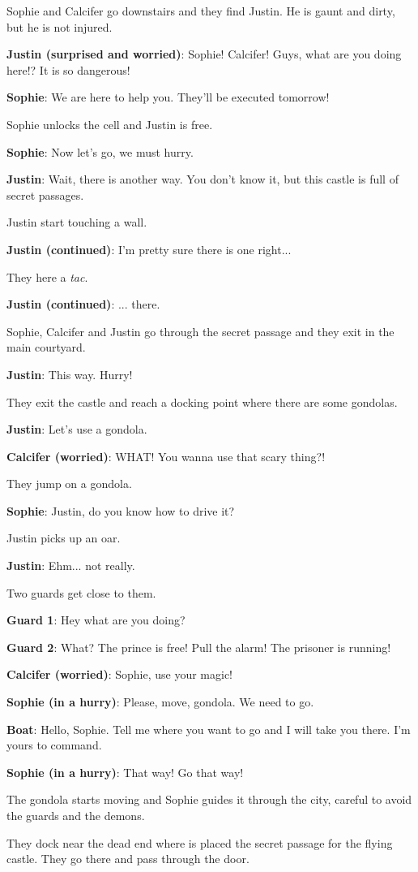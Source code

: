 
Sophie and Calcifer go downstairs and they find Justin. He is gaunt and dirty, but he is not injured.

\textbf{Justin (surprised and worried)}: Sophie! Calcifer! Guys, what are you doing here!? It is so dangerous!

\textbf{Sophie}: We are here to help you. They'll be executed tomorrow!

Sophie unlocks the cell and Justin is free.

\textbf{Sophie}: Now let's go, we must hurry.

\textbf{Justin}: Wait, there is another way. You don't know it, but this castle is full of secret passages.

Justin start touching a wall.

\textbf{Justin (continued)}: I'm pretty sure there is one right...

They here a \textit{tac}.

\textbf{Justin (continued)}: ... there.

Sophie, Calcifer and Justin go through the secret passage and they exit in the main courtyard.

\textbf{Justin}: This way. Hurry! 

They exit the castle and reach a docking point where there are some gondolas.

\textbf{Justin}: Let's use a gondola.

\textbf{Calcifer (worried)}: WHAT! You wanna use that scary thing?!

They jump on a gondola.

\textbf{Sophie}: Justin, do you know how to drive it?

Justin picks up an oar.

\textbf{Justin}: Ehm... not really.

Two guards get close to them.

\textbf{Guard 1}: Hey what are you doing?

\textbf{Guard 2}: What? The prince is free! Pull the alarm! The prisoner is running!

\textbf{Calcifer (worried)}: Sophie, use your magic!

\textbf{Sophie (in a hurry)}: Please, move, gondola. We need to go.

\textbf{Boat}: Hello, Sophie. Tell me where you want to go and I will take you there. I’m yours to command.

\textbf{Sophie (in a hurry)}: That way! Go that way!

The gondola starts moving and Sophie guides it through the city, careful to avoid the guards and the demons.

They dock near the dead end where is placed the secret passage for the flying castle. They go there and pass through the door.
